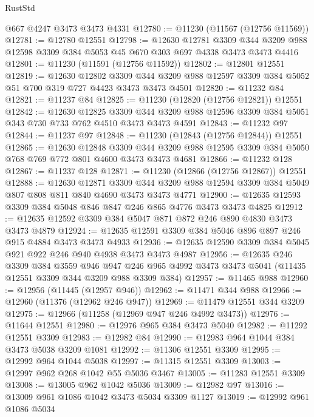\begin{lexlean}{RustStd}
\begin{coremodule}
{\begin{coremodule}
{{{{{{{{{{{{{{{{{{{{{{{{{{{{{{{{{{{{{{{{{{{{{{{{{{{{{{{{{{{{{{{{{{{{{{{{{{{{{{{{{{{{{    @667
    @4247
    @3473
    @3473
    @4331
@12780 := @11230 (@11567 (@12756 @11569))
@12781 := @12780 @12551
@12798 := @12630
    @12781
    @3309
    @344
    @3209
    @988
    @12598
    @3309
    @384
    @5053
    @45
    @670
    @303
    @697
    @4338
    @3473
    @3473
    @4416
@12801 := @11230 (@11591 (@12756 @11592))
@12802 := @12801 @12551
@12819 := @12630
    @12802
    @3309
    @344
    @3209
    @988
    @12597
    @3309
    @384
    @5052
    @51
    @700
    @319
    @727
    @4423
    @3473
    @3473
    @4501
@12820 := @11232 @84
@12821 := @11237 @84
@12825 := @11230 (@12820 (@12756 @12821)) @12551
@12842 := @12630
    @12825
    @3309
    @344
    @3209
    @988
    @12596
    @3309
    @384
    @5051
    @343
    @730
    @733
    @762
    @4510
    @3473
    @3473
    @4591
@12843 := @11232 @97
@12844 := @11237 @97
@12848 := @11230 (@12843 (@12756 @12844)) @12551
@12865 := @12630
    @12848
    @3309
    @344
    @3209
    @988
    @12595
    @3309
    @384
    @5050
    @768
    @769
    @772
    @801
    @4600
    @3473
    @3473
    @4681
@12866 := @11232 @128
@12867 := @11237 @128
@12871 := @11230 (@12866 (@12756 @12867)) @12551
@12888 := @12630
    @12871
    @3309
    @344
    @3209
    @988
    @12594
    @3309
    @384
    @5049
    @807
    @808
    @811
    @840
    @4690
    @3473
    @3473
    @4771
@12900 := @12635 @12593 @3309 @384 @5048 @846 @847 @246 @865 @4776 @3473 @3473 @4825
@12912 := @12635 @12592 @3309 @384 @5047 @871 @872 @246 @890 @4830 @3473 @3473 @4879
@12924 := @12635 @12591 @3309 @384 @5046 @896 @897 @246 @915 @4884 @3473 @3473 @4933
@12936 := @12635 @12590 @3309 @384 @5045 @921 @922 @246 @940 @4938 @3473 @3473 @4987
@12956 := @12635
    @246
    @3309
    @384
    @3559
    @946
    @947
    @246
    @965
    @4992
    @3473
    @3473
    @5041
    (@11435 @12551 @3309 @344 @3209 @988 @3309 @384)
@12957 := @11465 @988
@12960 := @12956 (@11445 (@12957 @946))
@12962 := @11471 @344 @988
@12966 := @12960 (@11376 (@12962 @246 @947))
@12969 := @11479 @12551 @344 @3209
@12975 := @12966 (@11258 (@12969 @947 @246 @4992 @3473))
@12976 := @11644 @12551
@12980 := @12976 @965 @384 @3473 @5040
@12982 := @11292 @12551 @3309
@12983 := @12982 @84
@12990 := @12983 @964 @1044 @384 @3473 @5038 @3209 @1081
@12992 := @11306 @12551 @3309
@12995 := @12992 @964 @1044 @5038
@12997 := @11315 @12551 @3309
@13003 := @12997 @962 @268 @1042 @55 @5036 @3467
@13005 := @11283 @12551 @3309
@13008 := @13005 @962 @1042 @5036
@13009 := @12982 @97
@13016 := @13009 @961 @1086 @1042 @3473 @5034 @3309 @1127
@13019 := @12992 @961 @1086 @5034
}}}}}}}}}}}}}}}}}}}}}}}}}}}}}}}}}}}}}}}}}}}}}}}}}}}}}}}}}}}}}}}}}}}}}}}}}}}}}}}}}}}}}
\end{coremodule}}
\end{coremodule}
\end{lexlean}
